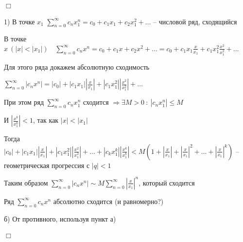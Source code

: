 \documentclass[12pt]{article}
\begin{document}
    \begin{MyProof}
        $\Box$

        1) В точке $x_1$ $\sum_{n = 0}^\infty c_n x_1^n = c_0 + c_1 x_1 + c_2 x_1^2 + \dots$ -- числовой ряд, сходящийся

        В точке $x \ (|x| < |x_1|) \quad \sum_{n = 0}^\infty c_n x^n = c_0 + c_1 x + c_2 x^2 + \dots = 
        c_0 + c_1 x_1 \frac{x}{x_1} + c_1 x_1^2 \frac{x^2}{x_1^2} + \dots$ 

        Для этого ряда докажем абсолютную сходимость

        $\sum_{n = 0}^\infty |c_n x^n| = |c_0| + |c_1 x_1| \left|\frac{x}{x_1}\right| + |c_1 x_1^2| \left|\frac{x^2}{x_1^2}\right| + \dots$

        При этом ряд $\sum_{n = 0}^\infty c_n x_1^n$ сходится $\Longrightarrow \exists M > 0 \ : \ |c_n x_1^n| \leq M$

        И $\left|\frac{x^k}{x_1^k}\right| < 1$, так как $|x| < |x_1|$

        Тогда $|c_0| + |c_1 x_1| \left|\frac{x}{x_1}\right| + |c_1 x_1^2| \left|\frac{x^2}{x_1^2}\right| + \dots + |c_k x_1^k| \left|\frac{x^k}{x_1^k}\right| < 
        M\left(1 + \left|\frac{x}{x_1}\right| + \left|\frac{x}{x_1}\right|^2 + \dots + \left|\frac{x}{x_1}\right|^k\right)$ -- геометрическая прогрессия с $|q| < 1$

        Таким образом $\sum_{n = 0}^\infty |c_n x^n| \sim M\sum_{n = 0}^\infty \left|\frac{x}{x_1}\right|^n$, который сходится

        Ряд $\sum_{n = 0}^\infty c_n x^n$ абсолютно сходится (и равномерно?)

        б) От противного, используя пункт а)

        $\Box$
    \end{MyProof}

    \smallvspace
\end{document}
